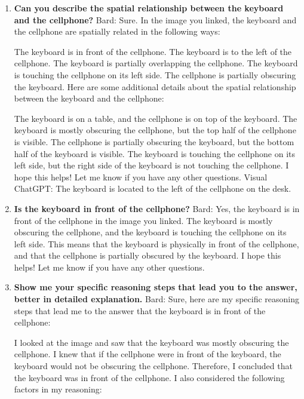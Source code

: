     \begin{enumerate}
        \item \textbf{Can you describe the spatial relationship between the keyboard and the cellphone?}
        \subitem Bard: 
        Sure. In the image you linked, the keyboard and the cellphone are spatially related in the following ways:
        
        The keyboard is in front of the cellphone.
        The keyboard is to the left of the cellphone.
        The keyboard is partially overlapping the cellphone.
        The keyboard is touching the cellphone on its left side.
        The cellphone is partially obscuring the keyboard.
        Here are some additional details about the spatial relationship between the keyboard and the cellphone:
        
        The keyboard is on a table, and the cellphone is on top of the keyboard.
        The keyboard is mostly obscuring the cellphone, but the top half of the cellphone is visible.
        The cellphone is partially obscuring the keyboard, but the bottom half of the keyboard is visible.
        The keyboard is touching the cellphone on its left side, but the right side of the keyboard is not touching the cellphone.
        I hope this helps! Let me know if you have any other questions.
        \subitem Visual ChatGPT: The keyboard is located to the left of the cellphone on the desk.
        \item \textbf{Is the keyboard in front of the cellphone?}
        \subitem Bard: Yes, the keyboard is in front of the cellphone in the image you linked. The keyboard is mostly obscuring the cellphone, and the keyboard is touching the cellphone on its left side. This means that the keyboard is physically in front of the cellphone, and that the cellphone is partially obscured by the keyboard. I hope this helps! Let me know if you have any other questions.
        \item \textbf{Show me your specific reasoning steps that lead you to the answer, better in detailed explanation.}
        \subitem Bard: Sure, here are my specific reasoning steps that lead me to the answer that the keyboard is in front of the cellphone:

        I looked at the image and saw that the keyboard was mostly obscuring the cellphone.
        I knew that if the cellphone were in front of the keyboard, the keyboard would not be obscuring the cellphone.
        Therefore, I concluded that the keyboard was in front of the cellphone.
        I also considered the following factors in my reasoning:
        

\end{enumerate}
